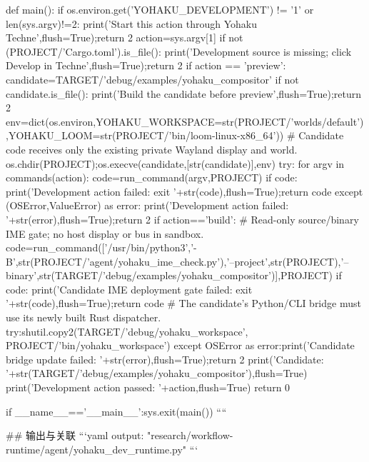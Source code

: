 def main():
    if os.environ.get('YOHAKU_DEVELOPMENT') != '1' or len(sys.argv)!=2:
        print('Start this action through Yohaku Techne',flush=True);return 2
    action=sys.argv[1]
    if not (PROJECT/'Cargo.toml').is_file():
        print('Development source is missing; click Develop in Techne',flush=True);return 2
    if action == 'preview':
        candidate=TARGET/'debug/examples/yohaku_compositor'
        if not candidate.is_file(): print('Build the candidate before preview',flush=True);return 2
        env=dict(os.environ,YOHAKU_WORKSPACE=str(PROJECT/'worlds/default'),YOHAKU_LOOM=str(PROJECT/'bin/loom-linux-x86_64'))
        # Candidate code receives only the existing private Wayland display and world.
        os.chdir(PROJECT);os.execve(candidate,[str(candidate)],env)
    try:
        for argv in commands(action):
            code=run_command(argv,PROJECT)
            if code: print('Development action failed: exit '+str(code),flush=True);return code
    except (OSError,ValueError) as error:
        print('Development action failed: '+str(error),flush=True);return 2
    if action=='build':
        # Read-only source/binary IME gate; no host display or bus in sandbox.
        code=run_command(['/usr/bin/python3','-B',str(PROJECT/'agent/yohaku_ime_check.py'),'--project',str(PROJECT),'--binary',str(TARGET/'debug/examples/yohaku_compositor')],PROJECT)
        if code:
            print('Candidate IME deployment gate failed: exit '+str(code),flush=True);return code
        # The candidate's Python/CLI bridge must use its newly built Rust dispatcher.
        try:shutil.copy2(TARGET/'debug/yohaku_workspace', PROJECT/'bin/yohaku_workspace')
        except OSError as error:print('Candidate bridge update failed: '+str(error),flush=True);return 2
        print('Candidate: '+str(TARGET/'debug/examples/yohaku_compositor'),flush=True)
    print('Development action passed: '+action,flush=True)
    return 0

if __name__=='__main__':sys.exit(main())
````

## 输出与关联
```yaml
output: "research/workflow-runtime/agent/yohaku_dev_runtime.py"
```
